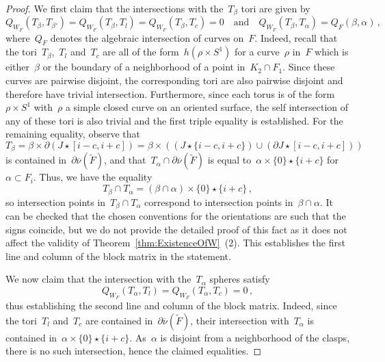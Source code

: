 \documentclass[10.9pt,a4paper]{amsart}
\theoremstyle{definition}
\theoremstyle{remark}
\newcommand{\lk}{\ell k}
\begin{document}
\begin{proof}
We first claim that the intersections with the~$T_\beta$ tori are given by
\[
Q_{W_F}(T_{\beta},T_{\beta'}) = Q_{W_F}(T_{\beta},T_l) = Q_{W_F}(T_{\beta},T_{c}) = 0\quad\text{and}\quad
Q_{W_F}(T_{\beta},T_{\alpha}) = Q_F(\beta, \alpha)\,, %
\]
where~$Q_F$ denotes the algebraic intersection of curves on~$F$.
Indeed, recall that the tori~$T_{\beta}$,~$T_l$ and~$T_{c}$ are all of the form~$h(\rho \times S^1)$ for a curve~$\rho$ in~$F$ which is either~$\beta$ or the boundary of a neighborhood of a point in~$K_2 \cap F_1$. Since these curves are pairwise disjoint, the corresponding tori are also pairwise disjoint and therefore have trivial intersection.
Furthermore, since each torus is of the form~$\rho \times S^1$ with~$\rho$ a simple closed curve on an oriented surface, the self intersection of any of these tori is also trivial and the first triple equality is established.
For the remaining equality, observe that
\[
T_{\beta}=\beta\times\partial(J\star[i-c,i+c])=\beta\times\left((J\star\{i-c,i+c\})\cup(\partial J\star[i-c,i+c])\right)
\]
is contained in~$\partial \overline{\nu}(\tilde F)$, and that~$T_{\alpha} \cap \partial \overline{\nu}(\tilde F)$ is equal to~$\alpha \times \{0\}\star \{i+c\}$ for $\alpha\subset F_{i}$. 
Thus, we have the equality
\[
T_{\beta} \cap T_{\alpha} = (\beta \cap \alpha) \times \{0\} \star \{i+c\}\,,
\]
so intersection points in~$T_{\beta} \cap T_{\alpha}$ correspond to intersection points in~$\beta \cap \alpha$.
It can be checked that the chosen conventions for the orientations are such that the signs coincide,
but we do not provide the detailed proof of this fact as it does not affect the validity of Theorem~\ref{thm:ExistenceOfW}~(2).
This establishes the first line and column of the block matrix in the statement.

We now claim that the intersection with the~$T_\alpha$ spheres satisfy
\[
Q_{W_F}(T_{\alpha},T_l) = Q_{W_F}(T_{\alpha},T_{c}) = 0\,,
\]
thus establishing the second line and column of the block matrix.
Indeed, since the tori~$T_l$ and~$T_{c}$ are contained in~$\partial \overline{\nu}(\tilde F)$, their intersection with~$T_{\alpha}$ is contained in~$\alpha \times \{0\} \star \{i+c\}$. As~$\alpha$ is disjoint from a neighborhood of the clasps, there is no such intersection, hence the claimed equalities.


\end{proof}
\end{document}
